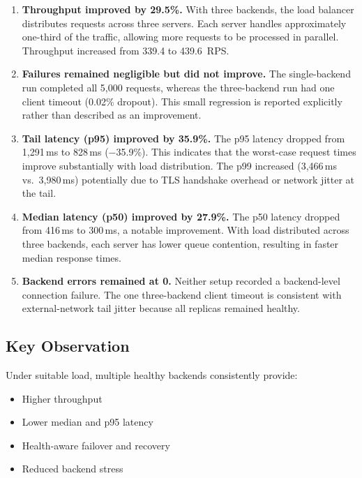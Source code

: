 \documentclass[12pt,a4paper]{article}
\begin{document}
\begin{enumerate}[leftmargin=2em]

\item \textbf{Throughput improved by 29.5\%.}
With three backends, the load balancer distributes requests across three servers. Each server handles approximately one-third of the traffic, allowing more requests to be processed in parallel. Throughput increased from 339.4 to 439.6~RPS.

\item \textbf{Failures remained negligible but did not improve.}
The single-backend run completed all 5,000 requests, whereas the three-backend run had one client timeout (0.02\% dropout). This small regression is reported explicitly rather than described as an improvement.

\item \textbf{Tail latency (p95) improved by 35.9\%.}
The p95 latency dropped from 1,291\,ms to 828\,ms ($-$35.9\%). This indicates that the worst-case request times improve substantially with load distribution. The p99 increased (3,466\,ms vs.\ 3,980\,ms) potentially due to TLS handshake overhead or network jitter at the tail.

\item \textbf{Median latency (p50) improved by 27.9\%.}
The p50 latency dropped from 416\,ms to 300\,ms, a notable improvement. With load distributed across three backends, each server has lower queue contention, resulting in faster median response times.

\item \textbf{Backend errors remained at 0.}
Neither setup recorded a backend-level connection failure. The one three-backend client timeout is consistent with external-network tail jitter because all replicas remained healthy.

\end{enumerate}

\subsection{Key Observation}

Under suitable load, multiple healthy backends consistently provide:
\begin{itemize}[leftmargin=2em]
    \item Higher throughput
    \item Lower median and p95 latency
    \item Health-aware failover and recovery
    \item Reduced backend stress
\end{itemize}
\end{document}
